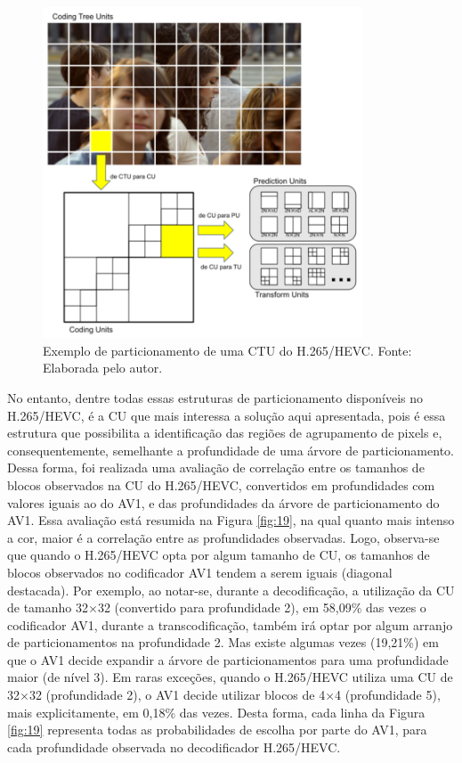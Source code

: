 \begin{figure}
    \centering
    \includegraphics[width=0.85\textwidth]{FIGURES/fig_18.png}
    \caption{Exemplo de particionamento de uma CTU do H.265/HEVC. Fonte: Elaborada pelo autor.}
    \label{fig:18}
\end{figure}

No entanto, dentre todas essas estruturas de particionamento disponíveis no H.265/HEVC, é a CU que mais interessa a solução aqui apresentada, pois é essa estrutura que possibilita a identificação das regiões de agrupamento de pixels e, consequentemente, semelhante a profundidade de uma árvore de particionamento. Dessa forma, foi realizada uma avaliação de correlação entre os tamanhos de blocos observados na CU do H.265/HEVC, convertidos em profundidades com valores iguais ao do AV1, e das profundidades da árvore de particionamento do AV1. Essa avaliação está resumida na Figura \ref{fig:19}, na qual quanto mais intenso a cor, maior é a correlação entre as profundidades observadas. Logo, observa-se que quando o H.265/HEVC opta por algum tamanho de CU, os tamanhos de blocos observados no codificador AV1 tendem a serem iguais (diagonal destacada). Por exemplo, ao notar-se, durante a decodificação, a utilização da CU de tamanho 32$\times$32 (convertido para profundidade 2), em 58,09\% das vezes o codificador AV1, durante a transcodificação, também irá optar por algum arranjo de particionamentos na profundidade 2. Mas existe algumas vezes (19,21\%) em que o AV1 decide expandir a árvore de particionamentos para uma profundidade maior (de nível 3). Em raras exceções, quando o H.265/HEVC utiliza uma CU de 32$\times$32 (profundidade 2), o AV1 decide utilizar blocos de 4$\times$4 (profundidade 5), mais explicitamente, em 0,18\% das vezes. Desta forma, cada linha da Figura \ref{fig:19} representa todas as probabilidades de escolha por parte do AV1, para cada profundidade observada no decodificador H.265/HEVC.

